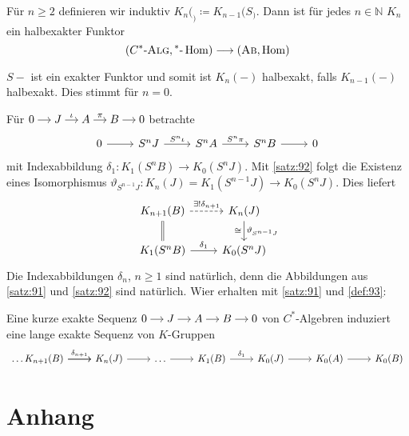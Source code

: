 \begin{definitionP}[label=def:93]
	Für $n \ge 2$ definieren wir induktiv $K_n(_) \coloneqq K_{n-1}(S_)$.
	Dann ist für jedes $n \in \mathbb{N}$ $K_n$ ein halbexakter Funktor
	\[
		\enbrace*{\CSTAR, {^*}\text{-}\Hom} \longrightarrow \enbrace*{\AB, \Hom}
	\]
\end{definitionP}
\begin{beweis}
	$S-$ ist ein exakter Funktor und somit ist $K_n(-)$ halbexakt, falls $K_{n-1}(-)$ halbexakt.
	Dies stimmt für $n=0$.
\end{beweis}

Für \(
	\begin{tikzcd}[cramped,sep=small]
		0 \rar & J \rar["\iota"] & A \rar["\pi"] & B \rar & 0
	\end{tikzcd}
\) betrachte 
\[
	\begin{tikzcd}
		0 \rar & S^n J \rar["S^n \iota"] & S^n A \rar["S^n \pi"] & S^n B \rar & 0
	\end{tikzcd}
\]
mit Indexabbildung $\delta_1 \colon K_1(S^n B) \to K_0(S^n J)$.
Mit \autoref{satz:92} folgt die Existenz eines Isomorphismus $\vartheta_{S^{n-1}J} \colon K_n(J) = K_1(S^{n-1}J) \to K_0(S^n J)$.
Dies liefert
\[
	\begin{tikzcd}
		K_{n+1}(B) \rar[dashed,"\exists! \delta_{n+1}"] & K_n(J) \dar["\cong"',"\vartheta_{S^{n-1}J}"] \\
		K_1(S^n B) \uar[equal] \rar["\delta_1"] & K_0(S^n J)
	\end{tikzcd}
\]
Die Indexabbildungen $\delta_n$, $n \ge 1$ sind natürlich, denn die Abbildungen aus \autoref{satz:91} und \autoref{satz:92} sind natürlich.
Wier erhalten mit \autoref{satz:91} und \autoref{def:93}:

\begin{proposition}
	Eine kurze exakte Sequenz \(
		\begin{tikzcd}[cramped,sep=small]
			0 \rar & J \rar & A \rar & B \rar & 0
		\end{tikzcd}
	\)
	von $C^*$-Algebren induziert eine lange exakte Sequenz von $K$-Gruppen
	\[
		\begin{tikzcd}
			\ldots \rar K_{n+1}(B) \rar["\delta_{n+1}"] & K_n(J) \rar & \ldots \rar & K_1(B) \rar["\delta_1"] & K_0(J) \rar & K_0(A) \rar & K_0(B)
		\end{tikzcd}
	\]
\end{proposition}


\cleardoubleoddemptypage
{}
\setcounter{page}{1}
\cleardoubleoddemptypage
\appendix

\section{Anhang} %
\label{sec:anhang}

\printindex
\printbibliography
\listoffigures
\todototoc
{}

